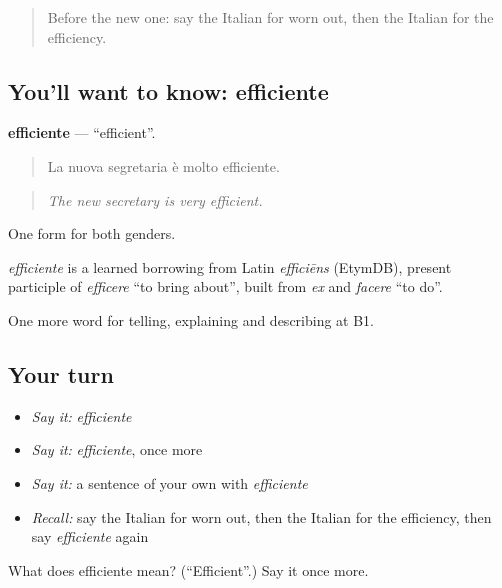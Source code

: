 \begin{quote}
Before the new one: say the Italian for worn out, then the Italian for the efficiency.
\end{quote}

\subsection*{You'll want to know: efficiente}
\textbf{efficiente} — \textquotedblleft{}efficient\textquotedblright{}.

\begin{quote}
La nuova segretaria è molto efficiente.
\end{quote}

\begin{quote}
\emph{The new secretary is very efficient.}
\end{quote}

One form for both genders.

\begin{cousinweb}
\emph{efficiente} is a learned borrowing from Latin \emph{efficiēns} (EtymDB), present participle of \emph{efficere} \textquotedblleft{}to bring about\textquotedblright{}, built from \emph{ex} and \emph{facere} \textquotedblleft{}to do\textquotedblright{}.
\end{cousinweb}

\begin{grammarlens}[title={What you've built}]
One more word for telling, explaining and describing at B1.
\end{grammarlens}

\subsection*{Your turn}
\begin{itemize}
\raggedright
  \item \emph{Say it:} \emph{efficiente}
  \item \emph{Say it:} \emph{efficiente}, once more
  \item \emph{Say it:} a sentence of your own with \emph{efficiente}
  \item \emph{Recall:} say the Italian for worn out, then the Italian for the efficiency, then say \emph{efficiente} again
\end{itemize}

\begin{tcolorbox}[breakable,colback=teal!4,colframe=teal!35!black,title={Before you move on}]
What does efficiente mean? (\textquotedblleft{}Efficient\textquotedblright{}.) Say it once more.
\end{tcolorbox}
